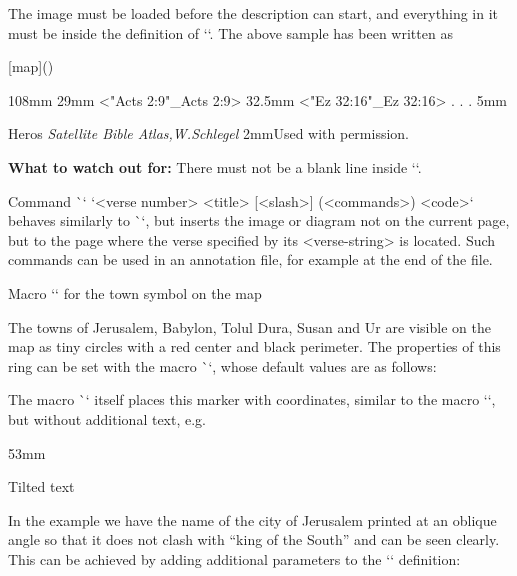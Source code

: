 {{The image must be loaded before the description can start, and everything in it must be inside the definition of `\insertBot`. 
The above sample has been written as

\begtt
{}[map](){
  \Heros \cond {}\rm %
  \vskip-1mm 
\putstext 2mm 108mm {%
  }%
  \LMfonts\sans {}\rm
  \puttext 145mm 29mm {<"Acts 2:9"_Acts 2:9>}
  \puttext 145mm 32.5mm {<"Ez 32:16"_Ez 32:16>}
.
.
.
  \puttext 2mm 5mm{{{{Heros \it Satellite Bible Atlas,\rm W.Schlegel}}
  \puttext 2mm 2mm{\Heros {}\rm Used with permission.}
  }%
\endtt

{\bf What to watch out for:} There must not be a blank line inside `\insertBot`.

Command \`\putBot` `<verse number> {<title>} [<slash>] (<commands>) {<code>}`
behaves similarly to \`\insertBot`, but inserts the image or diagram not on the current
page, but to the page where the verse specified by its <verse-string> is located.
Such commands can be used in an annotation file, for example at the end of the file.


\secc[town] Macro `\town` for the town symbol on the map


The towns of Jerusalem, Babylon, Tolul Dura, Susan and Ur are visible on the map as tiny circles with a red center and black perimeter.
The properties of this ring can be set with the macro \`\townparams`, whose default values are as follows:

\begtt
\def\townparams{
   \hhkern=.8pt %
   \lwidth=.5pt %
   \fcolor=\Red %
   \lcolor=\Black %
}
\endtt

The macro \`\town` itself places this marker with coordinates, similar to the macro `\puttext`, but without additional text, e.g.

\begtt
  \town 101.5mm 53mm %
\endtt

\secc [slope] Tilted text

In the example we have the name of the city of Jerusalem printed at an oblique angle so that it does not clash with “king of the South” and can be seen clearly.
This can be achieved by adding additional parameters to the `\puttext` definition:

}}}}
